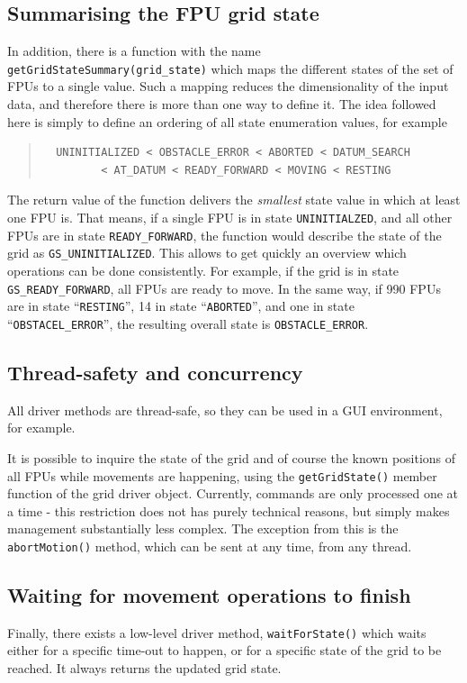 \documentclass[11pt,a4paper]{report}
\begin{document}
\subsection{Summarising the FPU grid state}
In addition, there is a function with the name
\texttt{getGridStateSummary(grid\_state)} which maps the different
states of the set of FPUs to a single value. Such a mapping reduces
the dimensionality of the input data, and therefore there is more than
one way to define it. The idea followed here is simply to define an
ordering of all state enumeration values, for example
\begin{quote}
\begin{verbatim}
  UNINITIALIZED < OBSTACLE_ERROR < ABORTED < DATUM_SEARCH
         < AT_DATUM < READY_FORWARD < MOVING < RESTING
\end{verbatim}
\end{quote}

The return value of the function delivers the \emph{smallest} state
value in which at least one FPU is.  That means, if a single FPU is in
state \texttt{UNINITIALZED}, and all other FPUs are in state
\texttt{READY\_FORWARD}, the function would describe the state of the
grid as \texttt{GS\_UNINITIALIZED}. This allows to get quickly an
overview which operations can be done consistently. For example, if
the grid is in state \texttt{GS\_READY\_FORWARD}, all FPUs are ready
to move. In the same way, if 990 FPUs are in state ``\texttt{RESTING}'',
14 in state ``\texttt{ABORTED}'', and one in state ``\texttt{OBSTACEL\_ERROR}'',
the resulting overall state is \texttt{OBSTACLE\_ERROR}.


\subsection{Thread-safety and concurrency}
All driver methods are thread-safe, so they can be used in a GUI
environment, for example.

It is possible to inquire the state of the grid and of course the
known positions of all FPUs while movements are happening, using the
\texttt{getGridState()} member function of the grid driver
object. Currently, commands are only processed one at a time - this
restriction does not has purely technical reasons, but simply makes
management substantially less complex. The exception from this is the
\texttt{abortMotion()} method, which can be sent at any time, from any
thread.

\subsection{Waiting for movement operations to finish}
Finally, there exists a low-level driver method,
\texttt{waitForState()} which waits either for a specific time-out to
happen, or for a specific state of the grid to be reached. It always
returns the updated grid state.
\end{document}
